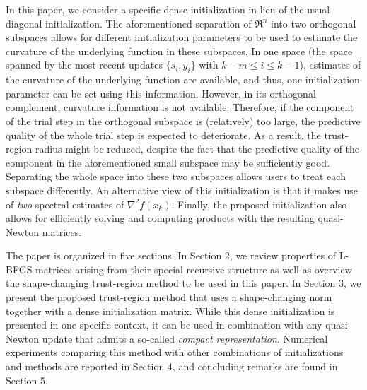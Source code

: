 In this paper, we consider a specific dense initialization in lieu of
the usual diagonal initialization.  The aforementioned separation of
$\Re^n$ into two orthogonal subspaces allows for different initialization parameters
to be used to estimate the curvature of the underlying %
function in
these subspaces. In one space 
(the space spanned by the most recent updates $\{s_i, y_i\}$ with $k-m \le i \le k-1$), 
estimates of the curvature of the
underlying function are available, and thus, one initialization parameter can be set
using this information.  However, in its orthogonal complement,
curvature information is not available.  
Therefore, if the component of the trial step in the orthogonal subspace is (relatively) too large,
the predictive quality of the whole trial step  is expected to deteriorate. As a result, the
trust-region radius might be reduced, despite the fact that the predictive quality of the component in the aforementioned small subspace may be sufficiently good.
Separating the whole space  into these two subspaces allows users to treat each subspace
differently.
An alternative view of this initialization is that it
makes use of \emph{two} spectral estimates of $\nabla^2 f(x_k)$.
Finally, the proposed initialization also allows for efficiently
solving and computing products with the resulting quasi-Newton
matrices.


\medskip

The paper is organized in five sections.  In Section 2, we review
properties of {\small L-BFGS} matrices arising from their special recursive
structure as well as overview the shape-changing trust-region method to be
used in this paper.  In Section 3, we present the proposed trust-region
method that uses a shape-changing norm together with a dense initialization
matrix.  While this dense initialization is presented in one specific
context, it can be used in combination with any quasi-Newton update that
admits a so-called \emph{compact representation}.  Numerical experiments
comparing this method with other combinations of initializations and
\LBFGS{} methods are reported in Section 4, and concluding remarks  are
found in Section 5.



